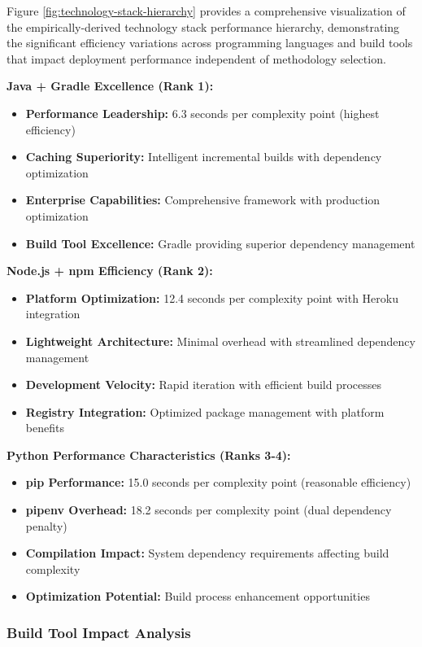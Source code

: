 Figure \ref{fig:technology-stack-hierarchy} provides a comprehensive visualization of the empirically-derived technology stack performance hierarchy, demonstrating the significant efficiency variations across programming languages and build tools that impact deployment performance independent of methodology selection.

\textbf{Java + Gradle Excellence (Rank 1):}
\begin{itemize}
\item \textbf{Performance Leadership:} 6.3 seconds per complexity point (highest efficiency)
\item \textbf{Caching Superiority:} Intelligent incremental builds with dependency optimization
\item \textbf{Enterprise Capabilities:} Comprehensive framework with production optimization
\item \textbf{Build Tool Excellence:} Gradle providing superior dependency management
\end{itemize}

\textbf{Node.js + npm Efficiency (Rank 2):}
\begin{itemize}
\item \textbf{Platform Optimization:} 12.4 seconds per complexity point with Heroku integration
\item \textbf{Lightweight Architecture:} Minimal overhead with streamlined dependency management
\item \textbf{Development Velocity:} Rapid iteration with efficient build processes
\item \textbf{Registry Integration:} Optimized package management with platform benefits
\end{itemize}

\textbf{Python Performance Characteristics (Ranks 3-4):}
\begin{itemize}
\item \textbf{pip Performance:} 15.0 seconds per complexity point (reasonable efficiency)
\item \textbf{pipenv Overhead:} 18.2 seconds per complexity point (dual dependency penalty)
\item \textbf{Compilation Impact:} System dependency requirements affecting build complexity
\item \textbf{Optimization Potential:} Build process enhancement opportunities
\end{itemize}

\subsubsection{Build Tool Impact Analysis}

